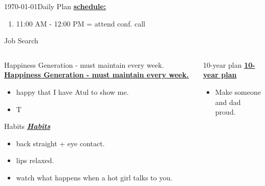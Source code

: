 \begin{columns}
\begin{column}{0.333\columnwidth}
\begin{frame}{\today}{Daily Plan}
\underline{\bf schedule:}\\
\begin{enumerate}
\tiny \item \tiny 11:00 AM - 12:00 PM = attend conf. call
\end{enumerate}
\end{frame}
\begin{frame}{Job Search}




\end{frame}
\ifdefined\POSTER
  \begin{columns}
   \begin{column}{0.22\columnwidth}
      \begin{block}{Happiness Generation - must maintain every week.}
\else
 \underline{\bf Happiness Generation - must maintain every week.} 
\fi
        \begin{itemize}
          \tiny \item \tiny happy that I have Atul to show me.  
          \item \tiny T 
        \end{itemize}
\ifdefined\POSTER
      \end{block}
\fi

\ifdefined\POSTER
    \begin{block}{Habits}
\else
 \underline{\bf \it Habits} 
\fi 
      \begin{itemize} 
        \tiny \item \tiny back straight + eye contact. 
      \item \tiny lips relaxed. 
      \item \tiny watch what happens when a hot girl talks to you. 
      \end{itemize}
\ifdefined\POSTER
    \end{block} 
  \end{column} %
\fi

\ifdefined\POSTER
  \begin{column}{0.5\columnwidth}
    \begin{block}{10-year plan}   %
\else 
 \underline{\bf 10-year plan}
\fi
      \begin{itemize}
      \item \small Make someone and dad proud.
      \end{itemize}
\ifdefined\POSTER
    \end{block}
\fi


\end{column}
\end{columns}
\end{column}
\end{columns}
